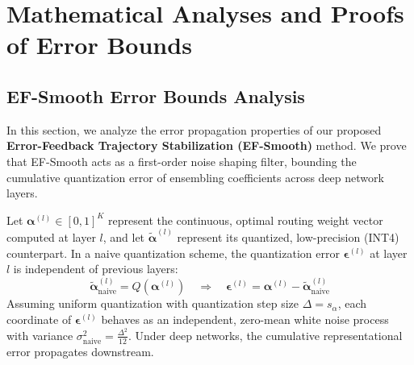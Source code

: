 \documentclass{article}
\theoremstyle{plain}
\theoremstyle{definition}
\theoremstyle{remark}
\begin{document}










\newpage
\appendix
\onecolumn
\section{Mathematical Analyses and Proofs of Error Bounds}
\label{app:mathematical_proofs}

\subsection{EF-Smooth Error Bounds Analysis}
\label{app:ef_smooth_analysis}

In this section, we analyze the error propagation properties of our proposed \textbf{Error-Feedback Trajectory Stabilization (EF-Smooth)} method. We prove that EF-Smooth acts as a first-order noise shaping filter, bounding the cumulative quantization error of ensembling coefficients across deep network layers.

Let $\boldsymbol{\alpha}^{(l)} \in [0, 1]^K$ represent the continuous, optimal routing weight vector computed at layer $l$, and let $\tilde{\boldsymbol{\alpha}}^{(l)}$ represent its quantized, low-precision (INT4) counterpart. In a naive quantization scheme, the quantization error $\boldsymbol{\epsilon}^{(l)}$ at layer $l$ is independent of previous layers:
\begin{equation}
    \tilde{\boldsymbol{\alpha}}_{\text{naive}}^{(l)} = Q\left(\boldsymbol{\alpha}^{(l)}\right) \quad \Longrightarrow \quad \boldsymbol{\epsilon}^{(l)} = \boldsymbol{\alpha}^{(l)} - \tilde{\boldsymbol{\alpha}}_{\text{naive}}^{(l)}
\end{equation}
Assuming uniform quantization with quantization step size $\Delta = s_{\alpha}$, each coordinate of $\boldsymbol{\epsilon}^{(l)}$ behaves as an independent, zero-mean white noise process with variance $\sigma_{\text{naive}}^2 = \frac{\Delta^2}{12}$. Under deep networks, the cumulative representational error propagates downstream.
\end{document}
